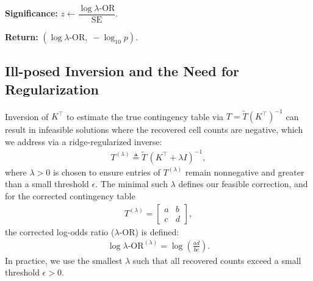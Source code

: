 \documentclass[pdflatex,sn-mathphys-num]{sn-jnl}%
\def\EQSP{3pt}
\newcommand{\cgather}[2][\EQSP]{\begingroup\setlength\abovedisplayskip{#1}\setlength\belowdisplayskip{#1}\begin{gather} #2 \end{gather}\endgroup\noindent}
\newcommand{\SPOR}{\textrm{$\lambda$-OR}}
\newcommand{\logor}{\log\SPOR}
\theoremstyle{thmstyleone}%
\theoremstyle{thmstyletwo}%
\theoremstyle{thmstylethree}%
\begin{document}
\begin{algorithm}[t]
\BlankLine
\textbf{Significance:}\;
$z \leftarrow \dfrac{\logor}{\text{SE}}$.\;

\BlankLine
\textbf{Return:}\;
\Return $(\logor,\;-\log_{10}p)$.\;

\end{algorithm}

 


\subsection{Ill-posed Inversion and the Need for Regularization}
Inversion of $K^\top$ to estimate the true contingency table via $T = \tilde{T} (K^\top)^{-1}$ can result in infeasible solutions where the recovered cell counts are negative, which we address via  a ridge-regularized inverse:
\cgather{
T^{(\lambda)} \triangleq \tilde{T} \,(K^\top + \lambda I)^{-1},
}
where $\lambda > 0$ is chosen to ensure entries of $T^{(\lambda)}$ remain nonnegative and greater than a small threshold $\epsilon$. The minimal such $\lambda$ defines our feasible correction, and for the corrected contingency table
\cgather{
T^{(\lambda)} = \begin{bmatrix}
a & b \\
c & d
\end{bmatrix},
}
the corrected log-odds ratio ($\SPOR$) is defined:
\cgather{
\logor^{(\lambda)} = \log\!\left( \frac{a d}{b c} \right).
}
In practice, we use the smallest $\lambda$ such that all recovered counts exceed a small threshold $\epsilon > 0$.
\end{document}
